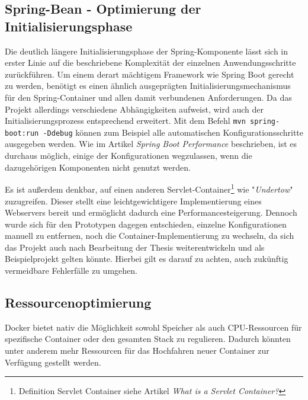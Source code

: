 \subsection{Spring-Bean - Optimierung der Initialisierungsphase}
\label{ss:spring-perf}

Die deutlich längere Initialisierungsphase der Spring-Komponente lässt sich in erster Linie auf die beschriebene Komplexität der einzelnen Anwendungsschritte zurückführen. Um einem derart mächtigem Framework wie Spring Boot gerecht zu werden, benötigt es einen ähnlich ausgeprägten Initialisierungsmechanismus für den Spring-Container und allen damit verbundenen Anforderungen. Da das Projekt allerdings verschiedene Abhängigkeiten aufweist, wird auch der Initialisierungsprozess entsprechend erweitert. Mit dem Befehl \verb+mvn spring-boot:run -Ddebug+ können zum Beispiel alle automatischen Konfigurationsschritte ausgegeben werden. Wie im Artikel \emph{Spring Boot Performance}\cite{spring-perf} beschrieben, ist es durchaus möglich, einige der Konfigurationen wegzulassen, wenn die dazugehörigen Komponenten nicht genutzt werden. 

Es ist außerdem denkbar, auf einen anderen Servlet-Container\footnote{Definition Servlet Container siehe Artikel \emph{What is a Servlet Container?}\cite{servlet-container-def}} wie "\emph{Undertow}" zuzugreifen. Dieser stellt eine leichtgewichtigere Implementierung eines Webservers bereit und ermöglicht dadurch eine Performancesteigerung. Dennoch wurde sich für den Prototypen dagegen entschieden, einzelne Konfigurationen manuell zu entfernen, noch die Container-Implementierung zu wechseln, da sich das Projekt auch nach Bearbeitung der Thesis weiterentwickeln und als Beispielprojekt gelten könnte. Hierbei gilt es darauf zu achten, auch zukünftig vermeidbare Fehlerfälle zu umgehen.


\subsection{Ressourcenoptimierung}
\label{par:resOpt}
Docker bietet nativ die Möglichkeit sowohl Speicher als auch CPU-Ressourcen für spezifische Container oder den gesamten Stack zu regulieren. Dadurch könnten unter anderem mehr Ressourcen für das Hochfahren neuer Container zur Verfügung gestellt werden.

